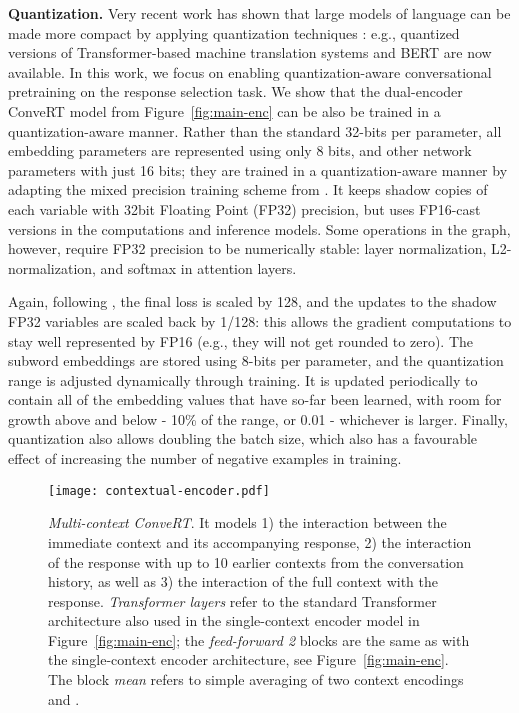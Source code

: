 \documentclass[11pt,a4paper]{article}
\begin{document}
\vspace{1.3mm}
\noindent \textbf{Quantization.}
Very recent work has shown that large models of language can be made more compact by applying quantization techniques \cite{Han:2016iclr}: e.g., quantized versions of Transformer-based machine translation systems \cite{Bhandare:2019arxiv} and BERT \cite{Shen:2019arxiv,Zhao:2019arxiv,Zafrir:2019arxiv} are now available. In this work, we focus on enabling quantization-aware conversational pretraining on the response selection task. We show that the dual-encoder ConveRT model from Figure~\ref{fig:main-enc} can be also be trained in a quantization-aware manner. Rather than the standard 32-bits per parameter, all embedding parameters are represented using only 8 bits, and other network parameters with just 16 bits; they are trained in a quantization-aware manner by adapting the mixed precision training scheme from . It keeps shadow copies of each variable with 32bit Floating Point (FP32) precision, but uses FP16-cast versions in the computations and inference models. Some operations in the graph, however, require FP32 precision to be numerically stable: layer normalization, L2-normalization, and softmax in attention layers.

Again, following , the final loss is scaled by 128, and the updates to the shadow FP32 variables are scaled back by 1/128: this allows the gradient computations to stay well represented by FP16 (e.g., they will not get rounded to zero). The subword embeddings are stored using 8-bits per parameter, and the quantization range is adjusted dynamically through training. It is updated periodically to contain all of the embedding values that have so-far been learned, with room for growth above and below - 10\% of the range, or 0.01 - whichever is larger. Finally, quantization also allows doubling the batch size, which also has a favourable effect of increasing the number of negative examples in training. 




\begin{figure}[!t]
\centering
\texttt{[image: contextual-encoder.pdf]}
\vspace{-1.5mm}
\caption{\textit{Multi-context ConveRT}. It models 1) the interaction between the immediate context and its accompanying response, 2) the interaction of the response with up to 10 earlier contexts from the conversation history, as well as 3) the interaction of the full context with the response. \textit{Transformer layers} refer to the standard Transformer architecture also used in the single-context encoder model in Figure~\ref{fig:main-enc}; the \textit{feed-forward 2} blocks are the same as with the single-context encoder architecture, see Figure~\ref{fig:main-enc}. The block \textit{mean} refers to simple averaging of two context encodings  and .}
\vspace{-1.5mm}
\label{fig:multi-enc}
\end{figure}
\end{document}
